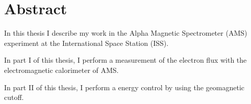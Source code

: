 \chapter*{Abstract}

\noindent 
In this thesis I describe my work in the Alpha Magnetic Spectrometer (AMS) experiment at the
International Space Station (ISS).  

In part I of this thesis, I perform a measurement of the electron flux with the electromagnetic calorimeter of AMS.

In part II of this thesis, I perform a energy control by using the geomagnetic cutoff.

